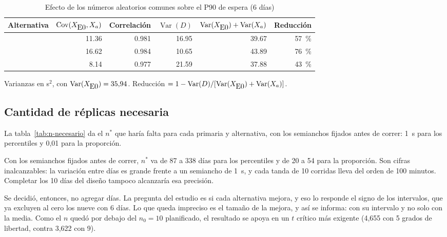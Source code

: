 \begin{table}[H]
\centering
\caption{Efecto de los números aleatorios comunes sobre el P90 de espera (6 días)}
\label{tab:nac}
\small
\begin{tabular}{@{}lrrrrr@{}}
\toprule
Alternativa & $\operatorname{Cov}(X_{\mbox{E0}{}}, X_a)$ & Correlación & $\operatorname{Var}(D)$ &
  $\operatorname{Var}(X_{\mbox{E0}{}}) + \operatorname{Var}(X_a)$ & Reducción \\
\midrule
\EI{}  & \num{11.36} & \num{0.981} & \num{16.95} & \num{39.67} & 57~\% \\
\ET{}  & \num{16.62} & \num{0.984} & \num{10.65} & \num{43.89} & 76~\% \\
\EIT{} & \num{8.14}  & \num{0.977} & \num{21.59} & \num{37.88} & 43~\% \\
\bottomrule
\end{tabular}

\smallskip
\footnotesize Varianzas en s$^2$, con $\operatorname{Var}(X_{\mbox{E0}{}}) = \num{35.94}$. Reducción
$= 1 - \operatorname{Var}(D) / [\operatorname{Var}(X_{\mbox{E0}{}}) + \operatorname{Var}(X_a)]$.
\end{table}

\subsection{Cantidad de réplicas necesaria}
\label{anx:n-necesario}

La tabla~\ref{tab:n-necesario} da el $n^{*}$ que haría falta para cada primaria y alternativa, con los
semianchos fijados antes de correr: 1~s para los percentiles y 0,01 para la proporción.


Con los semianchos fijados antes de correr, $n^{*}$ va de 87 a 338 días para los percentiles y de 20 a 54 para
la proporción. Son cifras inalcanzables: la variación entre días es grande frente a un semiancho de 1~s, y cada
tanda de 10 corridas lleva del orden de 100 minutos. Completar los 10 días del diseño tampoco alcanzaría
esa precisión.

Se decidió, entonces, no agregar días. La pregunta del estudio es si cada alternativa mejora, y eso lo responde
el signo de los intervalos, que ya excluyen al cero los nueve con 6 días. Lo que queda impreciso es el tamaño de
la mejora, y así se informa: con su intervalo y no solo con la media. Como el $n$ quedó por debajo del $n_0 = 10$
planificado, el resultado se apoya en un $t$ crítico más exigente (4,655 con 5 grados de libertad, contra 3,622
con 9).
